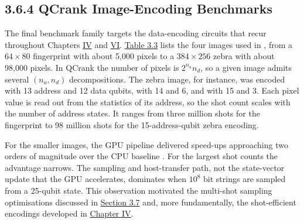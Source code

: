 \documentclass{report}
\theoremstyle{plain}
\theoremstyle{definition}
\theoremstyle{remark}
\begin{document}
\subsection{3.6.4 QCrank Image-Encoding Benchmarks}\label{sec:qgear:results-qcrank}

The final benchmark family targets the data-encoding circuits that recur throughout Chapters \hyperref[ch:qml]{IV} and \hyperref[ch:synthesis]{VI}. \hyperref[tab:qgear:qcrank]{Table 3.3} lists the four images used in \cite{guo2025qgear}, from a $64\times 80$ fingerprint with about 5,000 pixels to a $384\times 256$ zebra with about 98,000 pixels. In QCrank the number of pixels is $2^{n_{a}}n_{d}$, so a given image admits several $(n_{a},n_{d})$ decompositions. The zebra image, for instance, was encoded with 13 address and 12 data qubits, with 14 and 6, and with 15 and 3. Each pixel value is read out from the statistics of its address, so the shot count scales with the number of address states. It ranges from three million shots for the fingerprint to 98 million shots for the 15-address-qubit zebra encoding.

For the smaller images, the GPU pipeline delivered speed-ups approaching two orders of magnitude over the CPU baseline \cite{guo2025qgear}. For the largest shot counts the advantage narrows. The sampling and host-transfer path, not the state-vector update that the GPU accelerates, dominates when $10^{8}$ bit strings are sampled from a 25-qubit state. This observation motivated the multi-shot sampling optimisations discussed in \hyperref[sec:qgear:discussion]{Section 3.7} and, more fundamentally, the shot-efficient encodings developed in \hyperref[ch:qml]{Chapter IV}.
\end{document}
